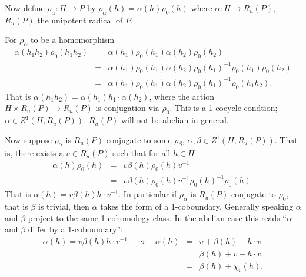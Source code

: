 Now define $\rho_\alpha:H \rightarrow P$ by $\rho_\alpha(h) = \alpha(h)\rho_0(h)$ where $\alpha:H\rightarrow R_u(P)$, $R_u(P)$ the unipotent radical of $P$. 

For $\rho_\alpha$ to be a homomorphism
\begin{eqnarray*}
	\alpha(h_1h_2)\rho_0(h_1h_2) &=& \alpha(h_1)\rho_0(h_1)\alpha(h_2)\rho_0(h_2) \\
	 &=& \alpha(h_1)\rho_0(h_1)\alpha(h_2)\rho_0(h_1)^{-1}\rho_0(h_1)\rho_0(h_2) \\
	 &=& \alpha(h_1)\rho_0(h_1)\alpha(h_2)\rho_0(h_1)^{-1}\rho_0(h_1h_2).
\end{eqnarray*}
That is $\alpha(h_1h_2) = \alpha(h_1) h_1\cdot\alpha(h_2)$, where the action $H \times R_u(P) \rightarrow R_u(P)$ is conjugation via $\rho_0$. This is a 1-cocycle condtion; $\alpha\in Z^1(H, R_u(P))$. $R_u(P)$ will not be abelian in general.

Now suppose $\rho_\alpha$ is $R_u(P)$-conjugate to some $\rho_\beta$, $\alpha, \beta \in Z^1(H, R_u(P))$. That is, there exists a $v \in R_u(P)$ such that for all $h\in H$
\begin{eqnarray*}
	\alpha(h)\rho_0(h) &=& v\beta(h)\rho_0(h)v^{-1} \\
	&=& v\beta(h)\rho_0(h)v^{-1}\rho_0(h)^{-1}\rho_0(h).
\end{eqnarray*}
That is $\alpha(h) = v\beta(h)h\cdot v^{-1}$. In particular if $\rho_\alpha$ is $R_u(P)$-conjugate to $\rho_0$, that is $\beta$ is trivial, then $\alpha$ takes the form of a 1-coboundary. Generally speaking $\alpha$ and $\beta$ project to the same 1-cohomology class. In the abelian case this reads ``$\alpha$ and $\beta$ differ by a 1-coboundary'':
\begin{eqnarray*}
	\alpha(h) = v\beta(h)h\cdot v^{-1} \quad\leadsto \quad\alpha(h) &=& v + \beta(h) - h\cdot v \\
	&=& \beta(h) + v - h\cdot v \\
	&=& \beta(h) + \chi_v(h).
\end{eqnarray*}

